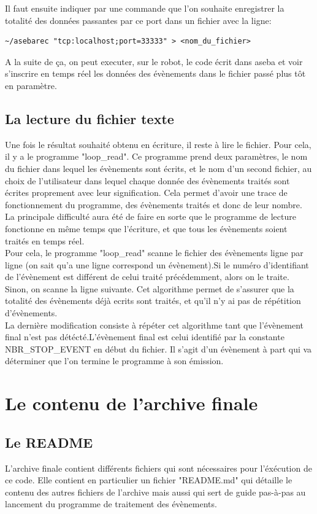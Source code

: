 \documentclass[a4paper, 12pt]{report}
\begin{document}
Il faut ensuite indiquer par une commande que l'on souhaite enregistrer la totalité des données passantes par ce port dans un fichier avec la ligne:
\begin{verbatim}
~/asebarec "tcp:localhost;port=33333" > <nom_du_fichier>
\end{verbatim}
 

A la suite de ça, on peut executer, sur le robot, le code écrit dans aseba et voir s'inscrire en temps réel les données des évènements dans le fichier passé plus tôt en paramètre.

\section{La lecture du fichier texte}
Une fois le résultat souhaité obtenu en écriture, il reste à lire le fichier. Pour cela, il y a le programme "loop\_read". Ce programme prend deux paramètres, le nom du fichier dans lequel les évènements sont écrits, et le nom d'un second fichier, au choix de l'utilisateur dans lequel chaque donnée des évènements traités sont écrites proprement avec leur signification. Cela permet d'avoir une trace de fonctionnement du programme, des évènements traités et donc de leur nombre.\\
La principale difficulté aura été de faire en sorte que le programme de lecture fonctionne en même temps que l'écriture, et que tous les évènements soient traités en temps réel.\\
Pour cela, le programme "loop\_read" scanne le fichier des évènements ligne par ligne (on sait qu'a une ligne correspond un évènement).Si le numéro d'identifiant de l'évènement est différent de celui traité précédemment, alors on le traite. Sinon, on scanne la ligne suivante. Cet algorithme permet de s'assurer que la totalité des évènements déjà ecrits sont traités, et qu'il n'y ai pas de répétition d'évènements.\\
La dernière modification consiste à répéter cet algorithme tant que l'évènement final n'est pas détécté.L'évènement final est celui identifié par la constante\\
 NBR\_STOP\_EVENT en début du fichier. Il s'agit d'un évènement à part qui va déterminer que l'on termine le programme à son émission.


\chapter{Le contenu de l'archive finale}
\section{Le README}
L'archive finale contient différents fichiers qui sont nécessaires pour l'éxécution de ce code. Elle contient en particulier un fichier "README.md" qui détaille le contenu des autres fichiers de l'archive mais aussi qui sert de guide pas-à-pas au lancement du programme de traitement des évènements.
\end{document}
